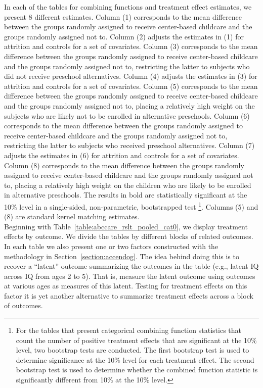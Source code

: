\noindent In each of the tables for combining functions and treatment effect estimates, we present 8 different estimates. Column (1) corresponds to the mean difference between the groups randomly assigned to receive center-based childcare and the groups randomly assigned not to. Column (2) adjusts the estimates in (1) for attrition and controls for a set of covariates. Column (3) corresponds to the mean difference between the groups randomly assigned to receive center-based childcare and the groups randomly assigned not to, restricting the latter to subjects who did not receive preschool alternatives. Column (4) adjusts the estimates in (3) for attrition and controls for a set of covariates. Column (5) corresponds to the mean difference between the groups randomly assigned to receive center-based childcare and the groups randomly assigned not to, placing a relatively high weight on the subjects who are likely not to be enrolled in alternative preschools. Column (6) corresponds to the mean difference between the groups randomly assigned to receive center-based childcare and the groups randomly assigned not to, restricting the latter to subjects who received preschool alternatives. Column (7) adjusts the estimates in (6) for attrition and controls for a set of covariates. Column (8) corresponds to the mean difference between the groups randomly assigned to receive center-based childcare and the groups randomly assigned not to, placing a relatively high weight on the children who are likely to be enrolled in alternative preschools. The results in bold are statistically significant at the 10\% level in a single-sided, non-parametric, bootstrapped test \footnote{For the tables that present categorical combining function statistics that count the number of positive treatment effects that are significant at the 10\% level, two bootstrap tests are conducted. The first bootstrap test is used to determine significance at the 10\% level for each treatment effect. The second bootstrap test is used to determine whether the combined function statistic is significantly different from 10\% at the  10\% level.}. Columns (5) and (8) are standard kernel matching estimates. \\

\noindent Beginning with Table~\ref{table:abccare_rslt_pooled_cat0}, we display treatment effects by outcome. We divide the tables by different blocks of related outcomes. In each table we also present one or two factors constructed with the methodology in Section~\ref{section:accendog}. The idea behind doing this is to recover a ``latent'' outcome summarizing the outcomes in the table (e.g., latent IQ across IQ from ages 2 to 5). That is, measure the latent outcome using outcomes at various ages as measures of this latent. Testing for treatment effects on this factor it is yet another alternative to summarize treatment effects across a block of outcomes.


\doublespacing
